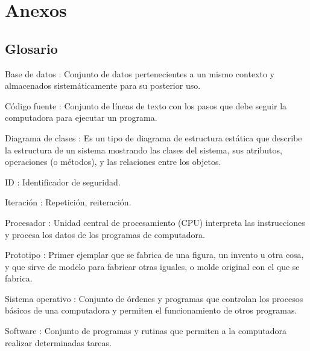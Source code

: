 \section{Anexos}
\subsection{Glosario}
Base de datos : Conjunto de datos pertenecientes a un mismo contexto y almacenados sistemáticamente para su posterior uso.

Código fuente : Conjunto de líneas de texto con los pasos que debe seguir la computadora para ejecutar un programa.

Diagrama de clases : Es un tipo de diagrama de estructura estática que describe la estructura de un sistema mostrando las clases del sistema, sus atributos, operaciones (o métodos), y las relaciones entre los objetos.

ID : Identificador de seguridad.

Iteración : Repetición, reiteración.

Procesador : Unidad central de procesamiento (CPU) interpreta las instrucciones y procesa los datos de los programas de computadora.

Prototipo : Primer ejemplar que se fabrica de una figura, un invento u otra cosa, y que sirve de modelo para fabricar otras iguales, o molde original con el que se fabrica.

Sistema operativo : Conjunto de órdenes y programas que controlan los procesos básicos de una computadora y permiten el funcionamiento de otros programas.

Software : Conjunto de programas y rutinas que permiten a la computadora realizar determinadas tareas.